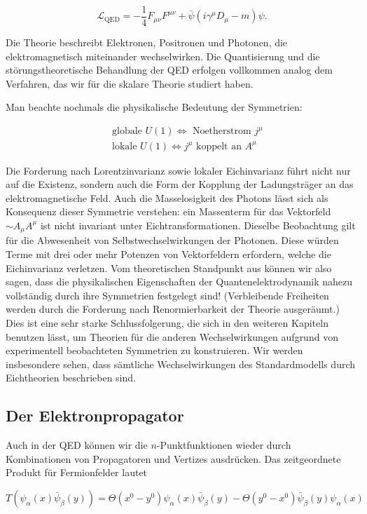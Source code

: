 \documentclass[10pt, letterpaper]{article}
\begin{document}
$$
\mathscr{L}_{\mathrm{QED}}=-\frac{1}{4} F_{\mu \nu} F^{\mu \nu}+\bar{\psi}\left(i \gamma^{\mu} D_{\mu}-m\right) \psi .
$$

Die Theorie beschreibt Elektronen, Positronen und Photonen, die elektromagnetisch miteinander wechselwirken. Die Quantisierung und die störungstheoretische Behandlung der QED erfolgen vollkommen analog dem Verfahren, das wir für die skalare Theorie studiert haben.

Man beachte nochmals die physikalische Bedeutung der Symmetrien:

$$
\begin{aligned}
& \text { globale } U(1) \Longleftrightarrow \text { Noetherstrom } j^{\mu} \\
& \text { lokale } U(1) \Longleftrightarrow j^{\mu} \text { koppelt an } A^{\mu}
\end{aligned}
$$

Die Forderung nach Lorentzinvarianz sowie lokaler Eichinvarianz führt nicht nur auf die Existenz, sondern auch die Form der Kopplung der Ladungsträger an das elektromagnetische Feld. Auch die Masselosigkeit des Photons lässt sich als Konsequenz dieser Symmetrie verstehen: ein Massenterm für das Vektorfeld $\sim A_{\mu} A^{\mu}$ ist nicht invariant unter Eichtransformationen. Dieselbe Beobachtung gilt für die Abwesenheit von Selbstwechselwirkungen der Photonen. Diese würden Terme mit drei oder mehr Potenzen von Vektorfeldern erfordern, welche die Eichinvarianz verletzen. Vom theoretischen Standpunkt aus können wir also sagen, dass die physikalischen Eigenschaften der Quantenelektrodynamik nahezu vollständig durch ihre Symmetrien festgelegt sind! (Verbleibende Freiheiten werden durch die Forderung nach Renormierbarkeit der Theorie ausgeräumt.) Dies ist eine sehr starke Schlussfolgerung, die sich in den weiteren Kapiteln benutzen lässt, um Theorien für die anderen Wechselwirkungen aufgrund von experimentell beobachteten Symmetrien zu konstruieren. Wir werden insbesondere sehen, dass sämtliche Wechselwirkungen des Standardmodells durch Eichtheorien beschrieben sind.

\subsection*{Der Elektronpropagator}
Auch in der QED können wir die $n$-Punktfunktionen wieder durch Kombinationen von Propagatoren und Vertizes ausdrücken. Das zeitgeordnete Produkt für Fermionfelder lautet

$$
T\left(\psi_{\alpha}(x) \bar{\psi}_{\beta}(y)\right)=\Theta\left(x^{0}-y^{0}\right) \psi_{\alpha}(x) \bar{\psi}_{\beta}(y)-\Theta\left(y^{0}-x^{0}\right) \bar{\psi}_{\beta}(y) \psi_{\alpha}(x)
$$
\end{document}
